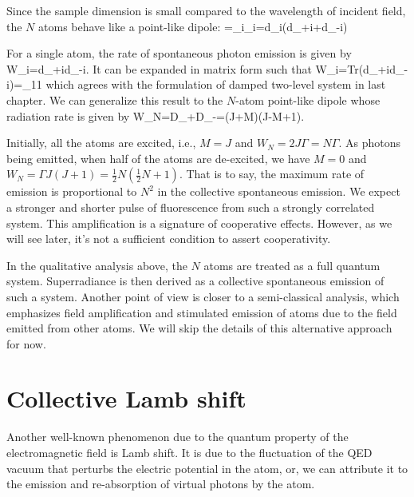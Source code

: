 Since the sample dimension is small compared to the wavelength of incident field, the $N$ atoms behave like a point-like dipole:
\bea
{}=\sum_i\bd_i=d\sum_i\left(d_{+i}+d_{-i}\right)
\eea

For a single atom, the rate of spontaneous photon emission is given by
\bea
W_i=\Gamma\langle d_{+i}d_{-i}\rangle.
\eea
It can be expanded in matrix form such that
\bea
W_i=\Gamma\cdot Tr\left(d_{+i}d_{-i}\rho\right)=\Gamma\rho_{11}
\eea
which agrees with the formulation of damped two-level system in last chapter. We can generalize this result to the $N$-atom point-like dipole whose radiation rate is given by
\bea
W_N=\Gamma\langle D_+D_-\rangle=\Gamma(J+M)(J-M+1).
\eea

Initially, all the atoms are excited, i.e., $M=J$ and $W_N=2J\Gamma=N\Gamma$. As photons being emitted, when half of the atoms are de-excited, we have $M=0$ and $W_N=\Gamma J(J+1)=\frac{1}{2}N(\frac{1}{2}N+1)$. That is to say, the maximum rate of emission is proportional to $N^2$ in the collective spontaneous emission. We expect a stronger and shorter pulse of fluorescence from such a strongly correlated system. This amplification is a signature of cooperative effects. However, as we will see later, it's not a sufficient condition to assert cooperativity.

In the qualitative analysis above, the $N$ atoms are treated as a full quantum system. Superradiance is then derived as a collective spontaneous emission of such a system. Another point of view is closer to a semi-classical analysis, which emphasizes field amplification and stimulated emission of atoms due to the field emitted from other atoms. We will skip the details of this alternative approach for now. 

\section{Collective Lamb shift}

Another well-known phenomenon due to the quantum property of the electromagnetic field is Lamb shift. It is due to the fluctuation of the QED vacuum that perturbs the electric potential in the atom, or, we can attribute it to the emission and re-absorption of virtual photons by the atom.

